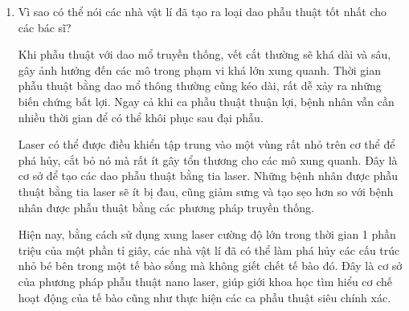 \begin{enumerate}[label=\bfseries Câu \arabic*:]
	
	{
		Em hãy tìm hiểu trên internet và thảo luận để tìm hiểu về các công nghệ hiện tại cũng như phát triển các công nghệ mới trong vật lí y sinh.
	}
	
	\hideall
	{
		Phạm vi nghiên cứu của lý sinh học trải từ so sánh chuỗi đến mạng thần kinh. Trong những năm gần đây, lý sinh học còn nghiên cứu đến chế tạo chi cơ học và thiết bị nano để điều hoà chức năng sinh học. Ngày nay các nghiên cứu đó thường được xem là thuộc về lĩnh vực tương ứng của công nghệ sinh học và công nghệ nano.
		
		Nghiên cứu truyền thống trong sinh học được tiến hành bằng các thí nghiệm tổng thể thống kê (statistical ensemble), dùng nồng độ mol của các đại phân tử. Vì các phân tử bên trong tế bào sống có số lượng ít, các kỹ thuật như khuếch đại PCR, thấm gel (gel blotting), gắn kết huỳnh quang và nhuộm in vivo được dùng để có thể xem kết quả thí nghiệm bằng mắt thường hoặc, it nhất, với thiết bị phóng đại quang học. Bằng các kỹ thuật này, nhà sinh học cố gắng làm sáng tỏ hệ thống tương tác phức tạp tạo ra các tiến trình cho sự sống. Lý sinh học cũng quan tâm đến những vấn đề tương tự trong sinh học, nhưng đặt ở mức độ một phân tử (nghĩa là số Reynolds thấp). Bằng cách áp dụng kiến thức và kỹ thuật thí nghiệm từ nhiều chuyên ngành, nhà lý sinh có thể quan sát gián tiếp hoặc mô hình hoá cấu trúc và tương tác của từng phân tử hay phức hợp phân tử.
	}
	\item {}
	
	
	{
		Vì sao có thể nói các nhà vật lí đã tạo ra loại dao phẫu thuật tốt nhất cho các bác sĩ?
	}
	
	\hideall
	{
		Khi phẫu thuật với dao mổ truyền thống, vết cắt thường sẽ khá dài và sâu, gây ảnh hưởng đến các mô trong phạm vi khá lớn xung quanh. Thời gian phẫu thuật bằng dao mổ thông thường cũng kéo dài, rất dễ xảy ra những biến chứng bất lợi. Ngay cả khi ca phẫu thuật thuận lợi, bệnh nhân vẫn cần nhiều thời gian để có thể khôi phục sau đại phẫu.
		
		Laser có thể được điều khiển tập trung vào một vùng rất nhỏ trên cơ thể để phá hủy, cắt bỏ nó mà rất ít gây tổn thương cho các mô xung quanh. Đây là cơ sở để tạo các dao phẫu thuật bằng tia laser. Những bệnh nhân được phẫu thuật bằng tia laser sẽ ít bị đau, cũng giảm sưng và tạo sẹo hơn so với bệnh nhân được phẫu thuật bằng các phương pháp truyền thống.
		
		Hiện nay, bằng cách sử dụng xung laser cường độ lớn trong thời gian 1 phần triệu của một phần tỉ giây, các nhà vật lí đã có thể làm phá hủy các cấu trúc nhỏ bé bên trong một tế bào sống mà không giết chết tế bào đó. Đây là cơ sở của phương pháp phẫu thuật nano laser, giúp giới khoa học tìm hiểu cơ chế hoạt động của tế bào cũng như thực hiện các ca phẫu thuật siêu chính xác.
	}
\end{enumerate}